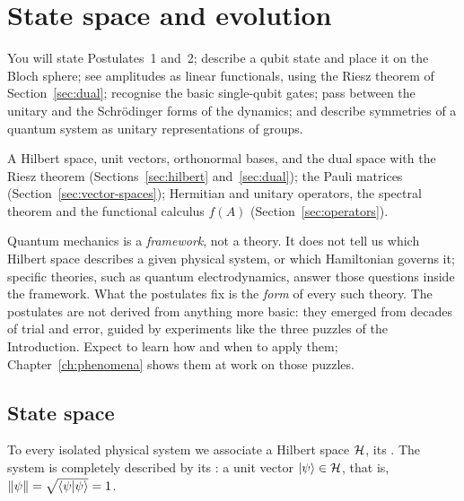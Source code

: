 \section{State space and evolution}\label{sec:state-evolution}

\begin{objectives}
  You will state Postulates~1 and~2; describe a qubit state and place it on the Bloch sphere; see amplitudes as linear functionals, using the Riesz theorem of Section~\ref{sec:dual}; recognise the basic single-qubit gates; pass between the unitary and the Schr\"odinger forms of the dynamics;
  and describe symmetries of a quantum system as unitary representations of groups.
\end{objectives}

\begin{recall}
  A Hilbert space, unit vectors, orthonormal bases, and the dual space with the Riesz theorem (Sections~\ref{sec:hilbert} and~\ref{sec:dual}); the Pauli matrices (Section~\ref{sec:vector-spaces}); Hermitian and unitary operators, the spectral theorem and the functional calculus $f(A)$ (Section~\ref{sec:operators}).
\end{recall}

Quantum mechanics is a \emph{framework}, not a theory. It does not tell us which Hilbert space describes a given physical system, or which Hamiltonian governs it; specific theories, such as quantum electrodynamics, answer those questions inside the framework. What the postulates fix is the \emph{form} of every such theory.
The postulates are not derived from anything more basic: they emerged from decades of trial and error, guided by experiments like the three puzzles of the Introduction. Expect to learn how and when to apply them; Chapter~\ref{ch:phenomena} shows them at work on those puzzles.

\subsection{State space}

\begin{postulate}\label{post:state}
  To every isolated physical system we associate a Hilbert space $\mathcal{H}$, its . The system is completely described by its : a unit vector $\left|\psi\right\rangle\in\mathcal{H}$, that is, $\left\|\psi\right\|=\sqrt{\left\langle\psi\middle|\psi\right\rangle}=1$.
\end{postulate}

